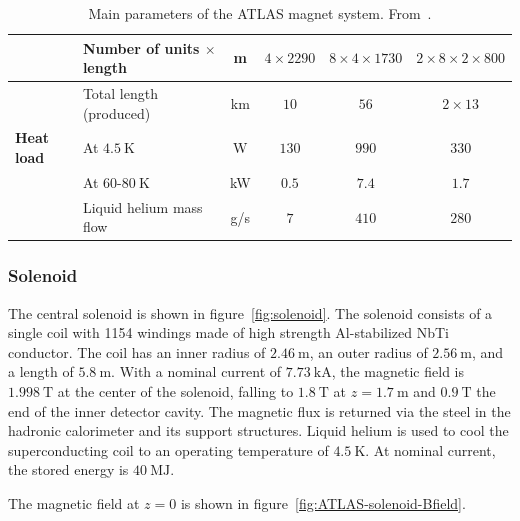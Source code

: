 \begin{table}[htbp]
\begin{tabular}{|l|l|c|c|c|c|}
		\hline
		 & Number of units $\times$ length & m & $4\times 2290$ & $8\times 4 \times 1730$ & $2\times8\times2\times800$ \\
		\hline
		 & Total length (produced) & km & $10$ & $56$ & $2\times13$ \\
		\hline
		\textbf{Heat load} & At $4.5~\mbox{K}$ & W & $130$ & $990$ & $330$ \\
		\hline
		 & At $60$-$80~\mbox{K}$ & kW & $0.5$ & $7.4$ & $1.7$ \\
		\hline
		 & Liquid helium mass flow & g/s & $7$ & $410$ & $280$ \\
		\hline
	\end{tabular}
	\caption{Main parameters of the ATLAS magnet system. From~\cite{TheATLASCollaboration:2008fg}.}
	\label{table:ATLAS-magnet-parameters}
\end{table}




\subsubsection{Solenoid}\label{sec:ATLAS-magnets-solenoid}

The central solenoid is shown in figure~\ref{fig:solenoid}. The solenoid consists of a single coil with 1154 windings made of high strength Al-stabilized NbTi conductor. The coil has an inner radius of $2.46~\mbox{m}$, an outer radius of $2.56~\mbox{m}$, and a length of $5.8~\mbox{m}$. With a nominal current of $7.73~\mbox{kA}$, the magnetic field is $1.998~\mbox{T}$ at the center of the solenoid, falling to $1.8~\mbox{T}$ at $z=1.7~\mbox{m}$ and $0.9~\mbox{T}$ the end of the inner detector cavity. The magnetic flux is returned via the steel in the hadronic calorimeter and its support structures. Liquid helium is used to cool the superconducting coil to an operating temperature of $4.5~\mbox{K}$. At nominal current, the stored energy is $40~\mbox{MJ}$. 

The magnetic field at $z=0$ is shown in figure~\ref{fig:ATLAS-solenoid-Bfield}.

